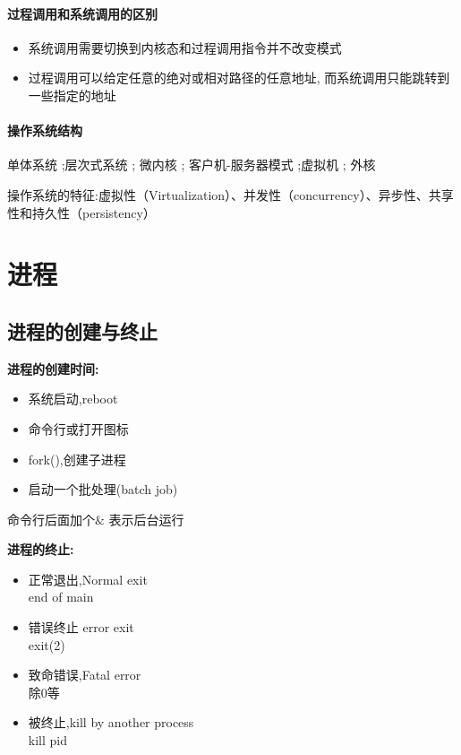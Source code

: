 \documentclass[UTF8,a4paper]{ctexart}
\newcommand{\spaceline}{\vspace{\baselineskip}}
\begin{document}
\paragraph{过程调用和系统调用的区别}
\begin{itemize}
	\item 系统调用需要切换到内核态和过程调用指令并不改变模式
	\item 过程调用可以给定任意的绝对或相对路径的任意地址, 而系统调用只能跳转到一些指定的地址
\end{itemize}

\paragraph{操作系统结构} 单体系统 ;层次式系统 ; 微内核 ; 客户机-服务器模式 ;虚拟机 ; 外核

操作系统的特征:虚拟性（Virtualization）、并发性（concurrency）、异步性、共享性和持久性（persistency）

\section{进程}
\subsection{进程的创建与终止}

\textbf{进程的创建时间:}
\begin{itemize}
	\item 系统启动,reboot
	\item 命令行或打开图标
	\item fork(),创建子进程
	\item 启动一个批处理(batch job)
\end{itemize}

{\color{blue}命令行后面加个$\&$ 表示后台运行}

\spaceline
\textbf{进程的终止:}
\begin{itemize}
	\item 正常退出,Normal exit\\
	      end of main
	\item 错误终止 error exit\\
	      exit(2)
	\item 致命错误,Fatal error\\
	      除0等
	\item 被终止,kill by another process\\
	      kill pid
\end{itemize}
\end{document}
